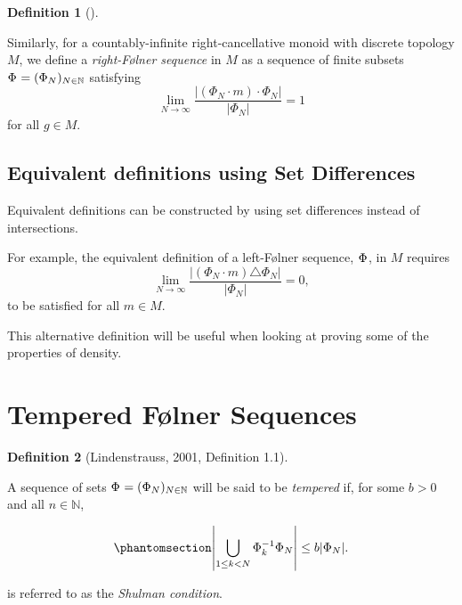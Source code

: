 \documentclass[
  british,
]{article}
\theoremstyle{definition}
\newtheorem{definition}{Definition}[section]
\theoremstyle{plain}
\theoremstyle{remark}
\newcommand{\CountingMeasure}[1]{{\left|#1\right|}}
\newcommand{\Folner}[1][\vphantom{}]{{\Phi}_{#1}}
\newcommand{\Monoid}{{M}}
\newcommand{\MonoidElement}{{m}}
\newcommand{\MonoidOperation}[2]{{#1}\cdot{#2}}
\begin{document}
\begin{definition}[]\protect\hypertarget{def-leftFolnerMonoid}{}\label{def-leftFolnerMonoid}

Similarly, for a countably-infinite right-cancellative monoid with
discrete topology \(\Monoid\), we define a \emph{right-Følner sequence}
in \(\Monoid\) as a sequence of finite subsets
\(\Folner =(\Folner[N])_{N\in\mathbb{N}}\) satisfying
\[\lim_{N\rightarrow\infty}\frac{\CountingMeasure{\MonoidOperation{(\MonoidOperation{\Folner[N]}{\MonoidElement})}{\Folner[N]}}}{\CountingMeasure{\Folner[N]}}=1\]
for all \(g\in M\).

\end{definition}

\subsection{Equivalent definitions using Set
Differences}\label{equivalent-definitions-using-set-differences}

Equivalent definitions can be constructed by using set differences
instead of intersections.

For example, the equivalent definition of a left-Følner sequence,
\(\Folner\), in \(\Monoid\) requires
\[\lim_{N\rightarrow\infty}\frac{\CountingMeasure{(\MonoidOperation{\Folner[N]}{\MonoidElement})\triangle\Folner[N]}}{\CountingMeasure{\Folner[N]}}=0, \]
to be satisfied for all \(\MonoidElement\in\Monoid\).

This alternative definition will be useful when looking at proving some
of the properties of density.

\section{Tempered Følner Sequences}\label{tempered-fuxf8lner-sequences}

\begin{definition}[{Lindenstrauss, 2001, Definition
1.1}]\protect\hypertarget{def-tempered}{}\label{def-tempered}

A sequence of sets \(\Folner=(\Folner[N])_{N\in\mathbb{N}}\) will be
said to be \emph{tempered} if, for some \(b>0\) and all
\(n\in\mathbb{N}\),

\begin{equation}\protect\phantomsection\label{eq-ShulmanCondition}{
\CountingMeasure{\bigcup_{1\leq k<N}\Folner[k]^{-1}\Folner[N]}\leq b\CountingMeasure{\Folner[N]}.
}\end{equation}

is referred to as the \emph{Shulman condition}.

\end{definition}
\end{document}
